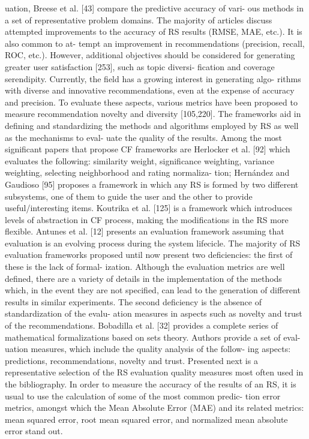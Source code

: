 \documentclass[11pt]{article}
\begin{document}
uation, Breese et al. [43] compare the predictive accuracy of vari-
ous methods in a set of representative problem domains.
The majority of articles discuss attempted improvements to the
accuracy of RS results (RMSE, MAE, etc.). It is also common to at-
tempt an improvement in recommendations (precision, recall,
ROC, etc.). However, additional objectives should be considered
for generating greater user satisfaction [253], such as topic diversi-
fication and coverage serendipity.
Currently, the field has a growing interest in generating algo-
rithms with diverse and innovative recommendations, even at
the expense of accuracy and precision. To evaluate these aspects,
various metrics have been proposed to measure recommendation
novelty and diversity [105,220].
The frameworks aid in defining and standardizing the methods
and algorithms employed by RS as well as the mechanisms to eval-
uate the quality of the results. Among the most significant papers
that propose CF frameworks are Herlocker et al. [92] which
evaluates the following: similarity weight, significance weighting,
variance weighting, selecting neighborhood and rating normaliza-
tion; Hernández and Gaudioso [95] proposes a framework in which
any RS is formed by two different subsystems, one of them to
guide the user and the other to provide useful/interesting items.
Koutrika et al. [125] is a framework which introduces levels of
abstraction in CF process, making the modifications in the RS more
flexible. Antunes et al. [12] presents an evaluation framework
assuming that evaluation is an evolving process during the system
lifecicle.
The majority of RS evaluation frameworks proposed until now
present two deficiencies: the first of these is the lack of formal-
ization. Although the evaluation metrics are well defined, there
are a variety of details in the implementation of the methods
which, in the event they are not specified, can lead to the
generation of different results in similar experiments. The
second deficiency is the absence of standardization of the evalu-
ation measures in aspects such as novelty and trust of the
recommendations.
Bobadilla et al. [32] provides a complete series of mathematical
formalizations based on sets theory. Authors provide a set of eval-
uation measures, which include the quality analysis of the follow-
ing aspects: predictions, recommendations, novelty and trust.
Presented next is a representative selection of the RS evaluation
quality measures most often used in the bibliography. In order to measure the accuracy of the results of an RS, it is
usual to use the calculation of some of the most common predic-
tion error metrics, amongst which the Mean Absolute Error
(MAE) and its related metrics: mean squared error, root mean
squared error, and normalized mean absolute error stand out.
\end{document}

